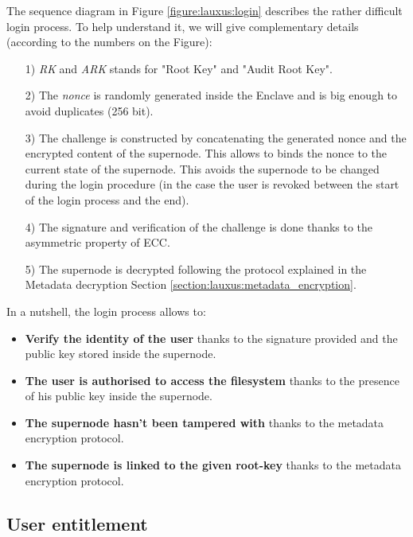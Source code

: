 \documentclass[../main.tex]{subfiles}
\begin{document}
\par The sequence diagram in Figure \ref{figure:lauxus:login} describes the rather difficult login process. To help understand it, we will give complementary details (according to the numbers on the Figure):
\begin{itemize}
    \item[1)] \textit{RK} and \textit{ARK} stands for "Root Key" and "Audit Root Key".
    \item[2)] The \textit{nonce} is randomly generated inside the Enclave and is big enough to avoid duplicates (256 bit).
    \item[3)] The challenge is constructed by concatenating the generated nonce and the encrypted content of the supernode. This allows to binds the nonce to the current state of the supernode. This avoids the supernode to be changed during the login procedure (in the case the user is revoked between the start of the login process and the end).
    \item[4)] The signature and verification of the challenge is done thanks to the asymmetric property of ECC.
    \item[5)] The supernode is decrypted following the protocol explained in the Metadata decryption Section \ref{section:lauxus:metadata_encryption}.
\end{itemize}
\par In a nutshell, the login process allows to:
\begin{itemize}
    \item \textbf{Verify the identity of the user} thanks to the signature provided and the public key stored inside the supernode.
    \item \textbf{The user is authorised to access the filesystem} thanks to the presence of his public key inside the supernode.
    \item \textbf{The supernode hasn't been tampered with} thanks to the metadata encryption protocol.
    \item \textbf{The supernode is linked to the given root-key} thanks to the metadata encryption protocol.
\end{itemize}


\subsection{User entitlement}
\label{section:lauxus:user_entitlement}
\end{document}
